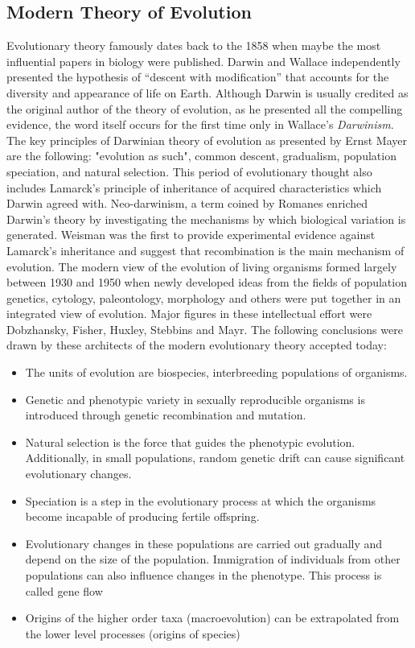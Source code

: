 \documentclass[11pt, a4paper,oneside]{report}
\begin{document}
\subsection{Modern Theory of Evolution}
Evolutionary theory famously dates back to the 1858 when maybe the most influential papers in biology were published. Darwin and Wallace independently presented the hypothesis of “descent with modification” that accounts for the diversity and appearance of life on Earth. Although Darwin is usually credited as the original author of the theory of evolution, as he presented all the compelling evidence, the word itself occurs for the first time only in Wallace's {\itshape Darwinism}\cite{Wallace1912}. The key principles of Darwinian theory of evolution as presented by Ernst Mayer\cite{Mayr2004} are the following: "evolution as such", common descent, gradualism, population speciation, and natural selection. This period of evolutionary thought also includes Lamarck's principle of inheritance of acquired characteristics which Darwin agreed with\cite{Burkhardt1995}. Neo-darwinism, a term coined by Romanes\cite{Romanes1892} enriched Darwin's theory by investigating the mechanisms by which biological variation is generated. Weisman was the first to provide experimental evidence against Lamarck's inheritance\cite{Weismann1891} and suggest that recombination is the main mechanism of evolution. 
The modern view of the evolution of living organisms formed largely between 1930 and 1950 when newly developed ideas from the fields of population genetics, cytology, paleontology, morphology and others were put together in an integrated view of evolution. Major figures in these intellectual effort were Dobzhansky, Fisher, Huxley, Stebbins and Mayr.  The following conclusions were drawn by these architects of the modern evolutionary theory accepted today\cite{Kutschera2004}:
\begin{itemize} 
\item The units of evolution are biospecies, interbreeding populations of organisms.\cite{MAYR1963}
\item Genetic and phenotypic variety in sexually reproducible organisms is introduced through genetic recombination and mutation.
\item Natural selection is the force that guides the phenotypic evolution. Additionally, in small populations, random genetic drift can cause significant evolutionary changes. 
\item Speciation is a step in the evolutionary process at which the organisms become incapable of producing fertile offspring. 
\item Evolutionary changes in these populations are carried out gradually and depend on the size of the population. Immigration of individuals from other populations can also influence changes in the phenotype. This process is called gene flow\cite{Grant1980}
\item Origins of the higher order taxa (macroevolution) can be extrapolated from the lower level processes (origins of species) 
\end{itemize}
\end{document}
